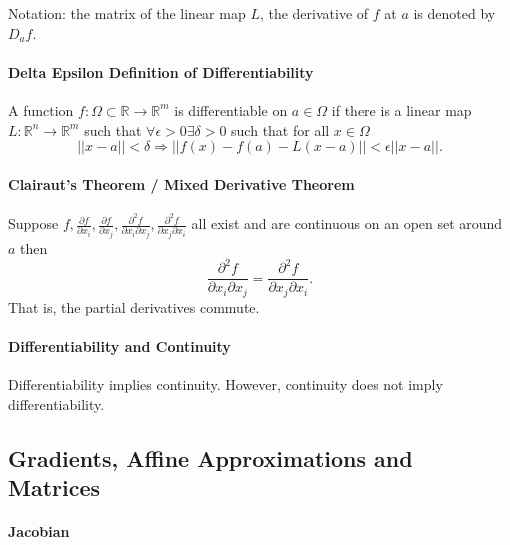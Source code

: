 \documentclass[12pt, letterpaper]{article}
\begin{document}
    Notation: the matrix of the linear map \(L\), the derivative of \(f\) at
    \(a\) is denoted by \(D_af\).

    \paragraph{Delta Epsilon Definition of Differentiability}
    A function \(f: \Omega\subset \mathbb{R}\to \mathbb{R}^m\) is 
    differentiable on \(a\in \Omega\) if there is a linear map \(L: \mathbb{R}^n\to \mathbb{R}^m\)
    such that \(\forall \epsilon > 0 \exists \delta > 0 \)
    such that for all \(x\in \Omega\)
    \[
    \left|\left|x - a\right|\right| < \delta
    \Rightarrow
    \left|\left|f(x) - f(a) - L(x-a)\right|\right|
    < \epsilon\left|\left|x - a\right|\right|. 
    \]

	\paragraph{Clairaut's Theorem / Mixed Derivative Theorem}
	Suppose \(
	f, \frac{\partial f}{\partial x_i}, \frac{\partial f}{\partial x_j},
		\frac{\partial^2 f}{\partial x_i \partial x_j},
		\frac{\partial^2 f}{\partial x_j \partial x_i}
	\)
	all exist and are continuous on an open set around \(a\) then
	\[
		\frac{\partial^2 f}{\partial x_i \partial x_j}
		=
		\frac{\partial^2 f}{\partial x_j \partial x_i}.
	\]
	That is, the partial derivatives commute.

    \paragraph{Differentiability and Continuity} Differentiability implies continuity.
    However, continuity does not imply differentiability.

    \subsection{Gradients, Affine Approximations and Matrices}
    
    \paragraph{Jacobian}

\end{document}
